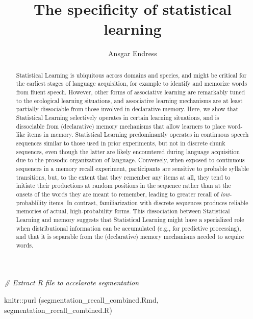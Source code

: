 \documentclass[
]{article}
\title{The specificity of statistical learning}
\author{Ansgar Endress}
\date{}
\newenvironment{Shaded}{\begin{snugshade}}{\end{snugshade}}
\newcommand{\CommentTok}[1]{\textcolor[rgb]{0.56,0.35,0.01}{\textit{#1}}}
\newcommand{\FunctionTok}[1]{\textcolor[rgb]{0.00,0.00,0.00}{#1}}
\newcommand{\NormalTok}[1]{#1}
\newcommand{\SpecialCharTok}[1]{\textcolor[rgb]{0.00,0.00,0.00}{#1}}
\newcommand{\StringTok}[1]{\textcolor[rgb]{0.31,0.60,0.02}{#1}}
\begin{document}
\maketitle
\begin{abstract}
Statistical Learning is ubiquitous across domains and species, and might
be critical for the earliest stages of language acquisition, for example
to identify and memorize words from fluent speech. However, other forms
of associative learning are remarkably tuned to the ecological learning
situations, and associative learning mechanisms are at least partially
dissociable from those involved in declarative memory. Here, we show
that Statistical Learning selectively operates in certain learning
situations, and is dissociable from (declarative) memory mechanisms that
allow learners to place word-like items in memory. Statistical Learning
predominantly operates in continuous speech sequences similar to those
used in prior experiments, but not in discrete chunk sequences, even
though the latter are likely encountered during language acquisition due
to the prosodic organization of language. Conversely, when exposed to
continuous sequences in a memory recall experiment, participants are
sensitive to probable syllable transitions, but, to the extent that they
remember any items at all, they tend to initiate their productions at
random positions in the sequence rather than at the onsets of the words
they are meant to remember, leading to greater recall of
\emph{low-}probablility items. In contrast, familiarization with
discrete sequences produces reliable memories of actual,
high-probability forms. This dissociation between Statistical Learning
and memory suggests that Statistical Learning might have a specialized
role when distributional information can be accumulated (e.g., for
predictive processing), and that it is separable from the (declarative)
memory mechanisms needed to acquire words.
\end{abstract}

{
\setcounter{tocdepth}{5}
\tableofcontents
}
\begin{Shaded}
\begin{Highlighting}[]
\CommentTok{\# Extract R file to accelarate segmentation}

\NormalTok{knitr}\SpecialCharTok{::}\FunctionTok{purl}\NormalTok{ (}\StringTok{\textquotesingle{}segmentation\_recall\_combined.Rmd\textquotesingle{}}\NormalTok{, }
      \StringTok{\textquotesingle{}segmentation\_recall\_combined.R\textquotesingle{}}\NormalTok{)}
\end{Highlighting}
\end{Shaded}
\end{document}
